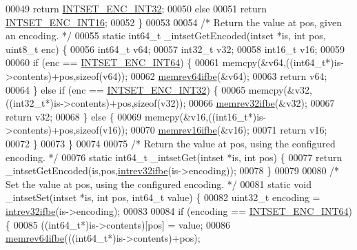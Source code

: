 \begin{DoxyCode}
00049         \textcolor{keywordflow}{return} \hyperlink{intset_8c_aa1aa222f55313754dadfb15b2a328f6b}{INTSET\_ENC\_INT32};
00050     \textcolor{keywordflow}{else}
00051         \textcolor{keywordflow}{return} \hyperlink{intset_8c_a60abb5e9fff1225d1f540718895eae90}{INTSET\_ENC\_INT16};
00052 \}
00053 
00054 \textcolor{comment}{/* Return the value at pos, given an encoding. */}
00055 \textcolor{keyword}{static} int64\_t \_intsetGetEncoded(intset *is, \textcolor{keywordtype}{int} pos, uint8\_t enc) \{
00056     int64\_t v64;
00057     int32\_t v32;
00058     int16\_t v16;
00059 
00060     \textcolor{keywordflow}{if} (enc == \hyperlink{intset_8c_a813ff1fc109e585be5fef8f605101064}{INTSET\_ENC\_INT64}) \{
00061         memcpy(&v64,((int64\_t*)is->contents)+pos,\textcolor{keyword}{sizeof}(v64));
00062         \hyperlink{endianconv_8h_aa311b9f944c3b988f3601698a95890c1}{memrev64ifbe}(&v64);
00063         \textcolor{keywordflow}{return} v64;
00064     \} \textcolor{keywordflow}{else} \textcolor{keywordflow}{if} (enc == \hyperlink{intset_8c_aa1aa222f55313754dadfb15b2a328f6b}{INTSET\_ENC\_INT32}) \{
00065         memcpy(&v32,((int32\_t*)is->contents)+pos,\textcolor{keyword}{sizeof}(v32));
00066         \hyperlink{endianconv_8h_a771f3656eb7d11a1e7f7294b657d8978}{memrev32ifbe}(&v32);
00067         \textcolor{keywordflow}{return} v32;
00068     \} \textcolor{keywordflow}{else} \{
00069         memcpy(&v16,((int16\_t*)is->contents)+pos,\textcolor{keyword}{sizeof}(v16));
00070         \hyperlink{endianconv_8h_a49372891e83ab7a970f0d98dda1870d9}{memrev16ifbe}(&v16);
00071         \textcolor{keywordflow}{return} v16;
00072     \}
00073 \}
00074 
00075 \textcolor{comment}{/* Return the value at pos, using the configured encoding. */}
00076 \textcolor{keyword}{static} int64\_t \_intsetGet(intset *is, \textcolor{keywordtype}{int} pos) \{
00077     \textcolor{keywordflow}{return} \_intsetGetEncoded(is,pos,\hyperlink{endianconv_8h_a4e85d9ae58a3b1e6ceaabfd4689002c7}{intrev32ifbe}(is->encoding));
00078 \}
00079 
00080 \textcolor{comment}{/* Set the value at pos, using the configured encoding. */}
00081 \textcolor{keyword}{static} \textcolor{keywordtype}{void} \_intsetSet(intset *is, \textcolor{keywordtype}{int} pos, int64\_t value) \{
00082     uint32\_t encoding = \hyperlink{endianconv_8h_a4e85d9ae58a3b1e6ceaabfd4689002c7}{intrev32ifbe}(is->encoding);
00083 
00084     \textcolor{keywordflow}{if} (encoding == \hyperlink{intset_8c_a813ff1fc109e585be5fef8f605101064}{INTSET\_ENC\_INT64}) \{
00085         ((int64\_t*)is->contents)[pos] = value;
00086         \hyperlink{endianconv_8h_aa311b9f944c3b988f3601698a95890c1}{memrev64ifbe}(((int64\_t*)is->contents)+pos);

\end{DoxyCode}
